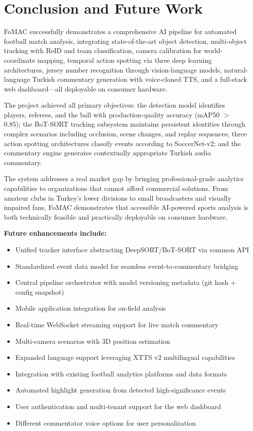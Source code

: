 \documentclass[10pt,twocolumn,a4paper]{article}
\begin{document}
\section{Conclusion and Future Work}

FoMAC successfully demonstrates a comprehensive AI pipeline for automated football match analysis, integrating state-of-the-art object detection, multi-object tracking with ReID and team classification, camera calibration for world-coordinate mapping, temporal action spotting via three deep learning architectures, jersey number recognition through vision-language models, natural-language Turkish commentary generation with voice-cloned TTS, and a full-stack web dashboard---all deployable on consumer hardware.

The project achieved all primary objectives: the detection model identifies players, referees, and the ball with production-quality accuracy (mAP50 $>$ 0.85); the BoT-SORT tracking subsystem maintains persistent identities through complex scenarios including occlusion, scene changes, and replay sequences; three action spotting architectures classify events according to SoccerNet-v2; and the commentary engine generates contextually appropriate Turkish audio commentary.

The system addresses a real market gap by bringing professional-grade analytics capabilities to organizations that cannot afford commercial solutions. From amateur clubs in Turkey's lower divisions to small broadcasters and visually impaired fans, FoMAC demonstrates that accessible AI-powered sports analysis is both technically feasible and practically deployable on consumer hardware.

\textbf{Future enhancements include:}
\begin{itemize}[noitemsep,topsep=0pt]
  \item Unified tracker interface abstracting DeepSORT/BoT-SORT via common API
  \item Standardized event data model for seamless event-to-commentary bridging
  \item Central pipeline orchestrator with model versioning metadata (git hash + config snapshot)
  \item Mobile application integration for on-field analysis
  \item Real-time WebSocket streaming support for live match commentary
  \item Multi-camera scenarios with 3D position estimation
  \item Expanded language support leveraging XTTS v2 multilingual capabilities
  \item Integration with existing football analytics platforms and data formats
  \item Automated highlight generation from detected high-significance events
  \item User authentication and multi-tenant support for the web dashboard
  \item Different commentator voice options for user personalization
\end{itemize}
\end{document}
